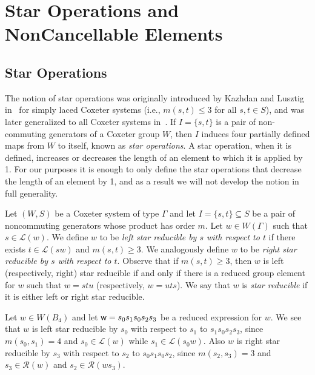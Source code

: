 \chapter{Star Operations and NonCancellable Elements}


\section{Star Operations}\label{sec:star}

The notion of star operations was originally introduced by Kazhdan and Lusztig in~\cite{Kazhdan1979} for simply laced Coxeter systems (i.e., $m(s,t) \leq 3$ for all $s,t \in S$), and was later generalized to all Coxeter systems in~\cite{Lusztig1985}. If $I=\{s,t\}$ is a pair of non-commuting generators of a Coxeter group $W$, then $I$ induces four partially defined maps from $W$ to itself, known as \emph{star operations}. A star operation, when it is defined, increases or decreases the length of an element to which it is applied by 1. For our purposes it is enough to only define the star operations that decrease the length of an element by 1, and as a result we will not develop the notion in full generality.

Let $(W,S)$ be a Coxeter system of type $\Gamma$ and let $I=\{s,t\}\subseteq S$ be a pair of noncommuting generators whose product has order $m$. Let $w \in W(\Gamma)$ such that $s \in \mathcal{L}(w)$. We define $w$ to be \emph{left star reducible by $s$ with respect to $t$} if there exists $t \in \mathcal{L}(sw)$ and $m(s,t) \geq 3$. We analogously define $w$ to be \emph{right star reducible by $s$ with respect to $t$}. Observe that if $m(s,t) \geq 3$, then $w$ is left (respectively, right) star reducible if and only if there is a reduced group element for $w$ such that $w=stu$ (respectively, $w=uts$). We say that $w$ is \emph{star reducible} if it is either left or right star reducible.

\begin{example}\label{ex:starred}
Let $w \in W(B_4)$ and let $\mathsf{w}=s_0s_1s_0s_2s_3$ be a reduced expression for $w$. We see that $w$ is left star reducible by $s_0$ with respect to $s_1$ to $s_1s_0s_2s_3$, since $m(s_0,s_1)=4$ and $s_0 \in \mathcal{L}(w)$ while $s_1 \in \mathcal{L}(s_0w)$. Also $w$ is right star reducible by $s_3$ with respect to $s_2$ to $s_0s_1s_0s_2$, since $m(s_2,s_3)=3$ and $s_3 \in \mathcal{R}(w)$ and $s_2 \in \mathcal{R}(ws_3)$.
\end{example}


